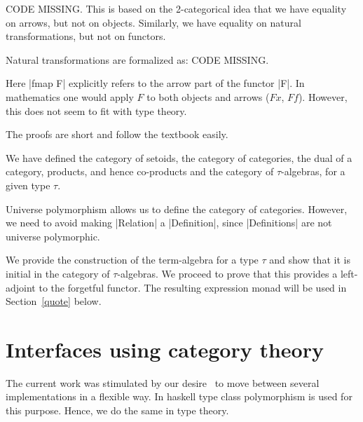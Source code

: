 \documentclass[a4paper,10pt,runningheads]{llncs}
\begin{document}
\newcommand{\rightarrowtext}{\ensuremath{\rightarrow}}
\newcommand{\textocirc}{\ensuremath\circ}

CODE MISSING.
This is based on the 2-categorical idea that we have equality on arrows, but not on objects.
Similarly, we have equality on natural transformations, but not on functors.

Natural transformations are formalized as:
CODE MISSING.
% 

Here |fmap F| explicitly refers to the arrow part of the functor |F|.
In mathematics one would apply $F$ to both objects and arrows ($F x$, $F f$). However, this does
not seem to fit with type theory.

The proofs are short and follow the textbook easily.

We have defined the category of setoids, the category of categories, the dual of a category,
products, and hence co-products and the category of $\tau$-algebras, for a given type $\tau$.

Universe polymorphism allows us to define the category of categories. However, we need to avoid
making |Relation| a |Definition|, since |Definitions| are not universe polymorphic.

We provide the construction of the term-algebra for a type $\tau$ and show that it is
initial in the category of $\tau$-algebras. We proceed to prove that this provides a left-adjoint
to the forgetful functor. The resulting expression monad will be used in Section~\ref{quote} below.

\section{Interfaces using category theory}\label{interfaces}\label{modul}
The current work was stimulated by our desire~\cite{Riemann} to move between several
implementations in a flexible way. In haskell type class polymorphism is used for this purpose.
Hence, we do the same in type theory.
\end{document}
